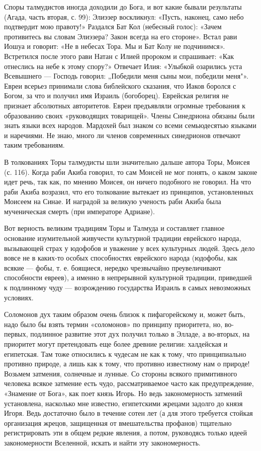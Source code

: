 Споры  талмудистов  иногда  доходили  до  Бога,  и  вот  какие  бывали
результаты (Агада,  часть вторая, с. 99):  Элиэзер воскликнул: «Пусть,
наконец, само небо подтвердит мою правоту!» Раздался Бат Кол (небесный
голос):  «Зачем  противитесь  вы  словам  Элиэзера?  Закон  всегда  на
его  стороне».  Встал  рави  Иошуа  и говорит:  «Не  в  небесах  Тора.
Мы  и Бат  Колу  не  подчинимся». Встретился  после  этого рави  Натан
с  Илией  пророком  и  спрашивает:  «Как отнеслись  на  небе  к  этому
спору?» Отвечает Илия: «Улыбкой  озарились уста Всевышнего --- Господь
говорил:  „Победили  меня сыны  мои,  победили  меня"». Евреи  всерьез
принимали  слова  библейского сказания,  что  Иаков  боролся с  Богом,
за  что  и  получил  имя Израиль  (богоборец).  Еврейская  религия  не
признает абсолютных авторитетов. Евреи предъявляли огромные требования
к образованию своих «руководящих  товарищей». Члены Синедриона обязаны
были  знать  языки   всех  народов.  Мардохей  был   знаком  со  всеми
семьюдесятью языками и наречиями. Не знаю, много ли членов современных
синедрионов отвечают таким требованиям.

В  толкованиях Торы  талмудисты  шли значительно  дальше автора  Торы,
Моисея  (с. 116).  Когда  раби Акиба  говорил, то  сам  Моисей не  мог
понять, о каком законе идет речь, так как, по мнению Моисея, он ничего
подобного не говорил.  На что раби Акиба возразил,  что его толкование
вытекает из принципов,  установленных Моисеем на Синае.  И наградой за
великую ученость  раби Акиба была мученическая  смерть (при императоре
Адриане).

Вот верность  великим традициям  Торы и  Талмуда и  составляет главное
основание  изумительной   живучести  культурной   традиции  еврейского
народа,  вызывающей страх  у  юдофобов и  уважение  у всех  культурных
людей. Здесь дело  вовсе не в каких-то  особых способностях еврейского
народа  (юдофобы,  как  всякие  ---  фобы,  т.  е.  боящиеся,  нередко
чрезвычайно преувеличивают способности евреев), а именно в непрерывной
культурной  традиции,  приведшей  к подлинному  чуду  ---  возрождению
государства Израиль в самых невозможных условиях.

Соломонов дух  таким образом  очень близок  к пифагорейскому  и, может
быть, надо  было бы взять  термин «соломонов» по  принципу приоритета,
но, во-первых, подлинное развитие этот  дух получил только в Элладе, а
во-вторых, на приоритет могут  претендовать еще более древние религии:
халдейская и египетская. Там тоже относились  к чудесам не как к тому,
что принципиально  противно природе, а  лишь как к тому,  что противно
известному нам  о природе!  Возьмем затмения,  солнечные и  лунные. Со
стороны  всякого  примитивного  человека всякое  затмение  есть  чудо,
рассматриваемое часто как предупреждение, «Знамение от Бога», как поет
князь Игорь.  Но ведь  закономерность затмений  установлена, насколько
мне  известно,  египетскими  жрецами  задолго  до  князя  Игоря.  Ведь
достаточно было  в течение  сотен лет (а  для этого  требуется стойкая
организация  жрецов, защищенная  от вмешательства  профанов) тщательно
регистрировать эти в общем редкие  явления, а потом, руководясь только
идеей закономерности Вселенной, искать и найти эту закономерность.

